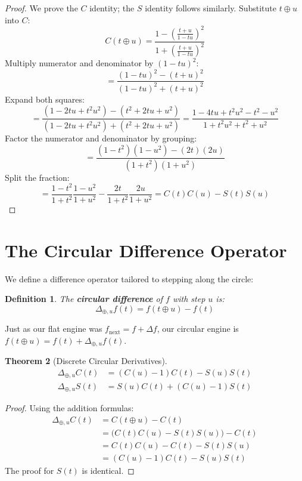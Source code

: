 \documentclass[12pt]{article}
\newtheorem{theorem}{Theorem}
\newtheorem{definition}[theorem]{Definition}
\newcommand{\next}[1]{#1_{\text{next}}}
\begin{document}
\begin{proof}
We prove the $C$ identity; the $S$ identity follows similarly. Substitute $t \oplus u$ into $C$:
\[ C(t \oplus u) = \frac{1 - \left(\frac{t+u}{1-tu}\right)^2}{1 + \left(\frac{t+u}{1-tu}\right)^2} \]
Multiply numerator and denominator by $(1-tu)^2$:
\[ = \frac{(1-tu)^2 - (t+u)^2}{(1-tu)^2 + (t+u)^2} \]
Expand both squares:
\[ = \frac{(1 - 2tu + t^2u^2) - (t^2 + 2tu + u^2)}{(1 - 2tu + t^2u^2) + (t^2 + 2tu + u^2)} = \frac{1 - 4tu + t^2u^2 - t^2 - u^2}{1 + t^2u^2 + t^2 + u^2} \]
Factor the numerator and denominator by grouping:
\[ = \frac{(1-t^2)(1-u^2) - (2t)(2u)}{(1+t^2)(1+u^2)} \]
Split the fraction:
\[ = \frac{1-t^2}{1+t^2}\frac{1-u^2}{1+u^2} - \frac{2t}{1+t^2}\frac{2u}{1+u^2} = C(t)C(u) - S(t)S(u) \]
\end{proof}

\section{The Circular Difference Operator}

We define a difference operator tailored to stepping along the circle:

\begin{definition}
The \textbf{circular difference} of $f$ with step $u$ is:
\[ \Delta_{\oplus, u} f(t) = f(t \oplus u) - f(t) \]
\end{definition}

Just as our flat engine was $\next{f} = f + \Delta f$, our circular engine is $f(t \oplus u) = f(t) + \Delta_{\oplus, u} f(t)$.

\begin{theorem}[Discrete Circular Derivatives]
\begin{align*}
    \Delta_{\oplus, u} C(t) &= (C(u)-1)C(t) - S(u)S(t) \\
    \Delta_{\oplus, u} S(t) &= S(u)C(t) + (C(u)-1)S(t)
\end{align*}
\end{theorem}

\begin{proof}
Using the addition formulas:
\begin{align*}
    \Delta_{\oplus, u} C(t) &= C(t \oplus u) - C(t) \\
    &= \big( C(t)C(u) - S(t)S(u) \big) - C(t) \\
    &= C(t)C(u) - C(t) - S(t)S(u) \\
    &= (C(u)-1)C(t) - S(u)S(t)
\end{align*}
The proof for $S(t)$ is identical.
\end{proof}
\end{document}

